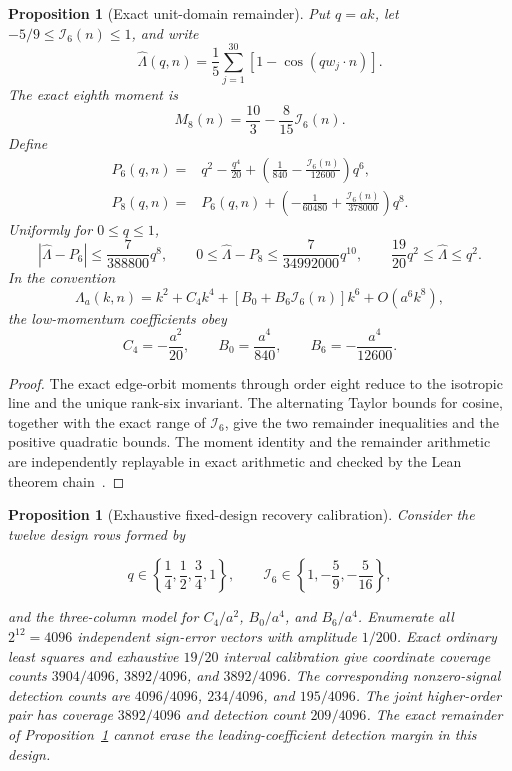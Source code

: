 \documentclass[11pt]{article}
\newtheorem{proposition}[theorem]{Proposition}
\theoremstyle{remark}
\theoremstyle{plain}
\begin{document}
\begin{proposition}[Exact unit-domain remainder]
\label{prop:seam-current-unit-remainder}
Put \(q=ak\), let \(-5/9\le\mathcal I_6(n)\le1\), and write
\[
\widehat\Lambda(q,n)=\frac15\sum_{j=1}^{30}
  [1-\cos(qw_j\mathbin{\cdot}n)].
\]
The exact eighth moment is
\[
M_8(n)=\frac{10}{3}-\frac{8}{15}\mathcal I_6(n).
\]
Define
\begin{align*}
P_6(q,n)={}&q^2-\frac{q^4}{20}
 +\left(\frac1{840}-\frac{\mathcal I_6(n)}{12600}\right)q^6,\\
P_8(q,n)={}&P_6(q,n)+\left(-\frac1{60480}
 +\frac{\mathcal I_6(n)}{378000}\right)q^8.
\end{align*}
Uniformly for \(0\le q\le1\),
\[
|\widehat\Lambda-P_6|\le\frac7{388800}q^8,
\qquad
0\le\widehat\Lambda-P_8\le\frac7{34992000}q^{10},
\qquad
\frac{19}{20}q^2\le\widehat\Lambda\le q^2.
\]
In the convention
\[
\Lambda_a(k,n)=k^2+C_4k^4+
  [B_0+B_6\mathcal I_6(n)]k^6+O(a^6k^8),
\]
the low-momentum coefficients obey
\[
C_4=-\frac{a^2}{20},\qquad
B_0=\frac{a^4}{840},\qquad
B_6=-\frac{a^4}{12600}.
\]
\end{proposition}

\begin{proof}
The exact edge-orbit moments through order eight reduce to the isotropic line
and the unique rank-six invariant. The alternating Taylor bounds for cosine,
together with the exact range of \(\mathcal I_6\), give the two remainder
inequalities and the positive quadratic bounds. The moment identity and the
remainder arithmetic are independently replayable in exact arithmetic and
checked by the Lean theorem chain~\cite{ophrepo}.
\end{proof}

\begin{proposition}[Exhaustive fixed-design recovery calibration]
\label{prop:seam-current-synthetic-recovery}
Consider the twelve design rows formed by

\[
q\in\left\{\frac14,\frac12,\frac34,1\right\},
\qquad
\mathcal I_6\in\left\{1,-\frac59,-\frac5{16}\right\},
\]

and the three-column model for \(C_4/a^2\), \(B_0/a^4\), and \(B_6/a^4\).
Enumerate all \(2^{12}=4096\) independent sign-error vectors with amplitude
\(1/200\). Exact ordinary least squares and exhaustive \(19/20\) interval
calibration give coordinate coverage counts \(3904/4096\), \(3892/4096\),
and \(3892/4096\). The corresponding nonzero-signal detection counts are
\(4096/4096\), \(234/4096\), and \(195/4096\). The joint higher-order pair has
coverage \(3892/4096\) and detection count \(209/4096\). The exact remainder
of Proposition~\ref{prop:seam-current-unit-remainder} cannot erase the
leading-coefficient detection margin in this design.
\end{proposition}
\end{document}
